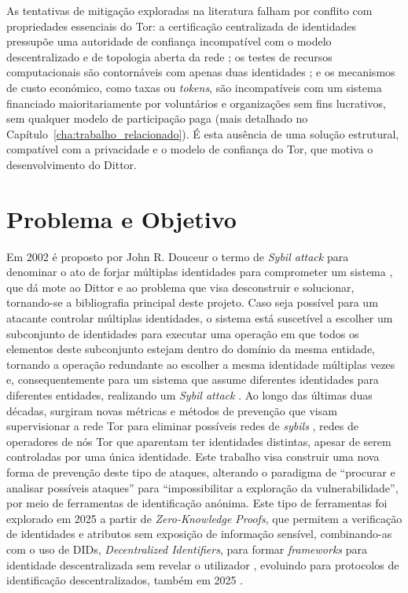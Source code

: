 As tentativas de mitigação exploradas na literatura falham por conflito com propriedades essenciais do Tor: a certificação centralizada de identidades pressupõe uma autoridade de confiança incompatível com o modelo descentralizado e de topologia aberta da rede \cite{douceur2002sybil}; os testes de recursos computacionais são contornáveis com apenas duas identidades \cite{levine2006survey}; e os mecanismos de custo económico, como taxas ou \textit{tokens}, são incompatíveis com um sistema financiado maioritariamente por voluntários e organizações sem fins lucrativos, sem qualquer modelo de participação paga (mais detalhado no Capítulo~\ref{cha:trabalho_relacionado}). É esta ausência de uma solução estrutural, compatível com a privacidade e o modelo de confiança do Tor, que motiva o desenvolvimento do Dittor.

\section*{Problema e Objetivo}
Em 2002 é proposto por John R. Douceur o termo de \textit{Sybil attack} para denominar o ato de forjar múltiplas identidades para comprometer um sistema \cite{douceur2002sybil}, que dá mote ao Dittor e ao problema que visa desconstruir e solucionar, tornando-se a bibliografia principal deste projeto. Caso seja possível para um atacante controlar múltiplas identidades, o sistema está suscetível a escolher um subconjunto de identidades para executar uma operação em que todos os elementos deste subconjunto estejam dentro do domínio da mesma entidade, tornando a operação redundante ao escolher a mesma identidade múltiplas vezes e, consequentemente para um sistema que assume diferentes identidades para diferentes entidades, realizando um \textit{Sybil attack} \cite{douceur2002sybil}. Ao longo das últimas duas décadas, surgiram novas métricas e métodos de prevenção que visam supervisionar a rede Tor para eliminar possíveis redes de \textit{sybils} \cite{levine2006survey}, redes de operadores de nós Tor que aparentam ter identidades distintas, apesar de serem controladas por uma única identidade. Este trabalho visa construir uma nova forma de prevenção deste tipo de ataques, alterando o paradigma de “procurar e analisar possíveis ataques” para “impossibilitar a exploração da vulnerabilidade”, por meio de ferramentas de identificação anónima. Este tipo de ferramentas foi explorado em 2025 a partir de \textit{Zero-Knowledge Proofs}, que permitem a verificação de identidades e atributos sem exposição de informação sensível, combinando-as com o uso de DIDs, \textit{Decentralized Identifiers}, para formar \textit{frameworks} para identidade descentralizada sem revelar o utilizador \cite{yuan2025scalable}, evoluindo para protocolos de identificação descentralizados, também em 2025 \cite{liu2025diap}.

